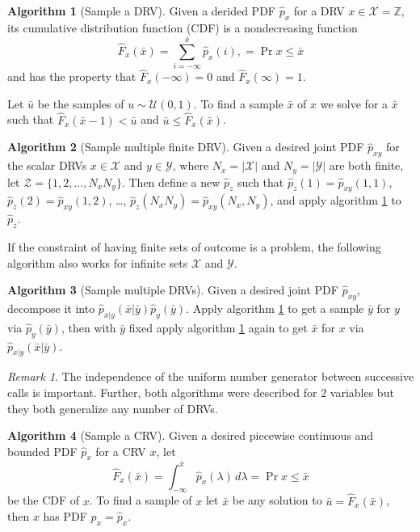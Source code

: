 \documentclass[margin=tiny]{hsrzf}
\theoremstyle{plain}
\theoremstyle{definition}
\newtheorem{alg}{Algorithm}[section]
\theoremstyle{remark}
\newtheorem*{remark}{Remark}
\begin{document}
\begin{alg}[Sample a DRV] \label{alg:sample-drv}
  Given a derided PDF $\hat{p}_x$ for a DRV $x \in \mathcal{X} = \mathbb{Z}$,
  its cumulative distribution function (CDF) is a nondecreasing function
  \[
    \hat{F}_x (\bar{x}) = \sum_{i = -\infty}^{\bar{x}} \hat{p}_x (i),
    = \Pr{x \leq \bar{x}}
  \]
  and has the property that $\hat{F}_x(-\infty) = 0$ and $\hat{F}_x(\infty) =
  1$.

  Let $\bar{u}$ be the samples of $u \sim \mathcal{U}(0,1)$. To find
  a sample $\bar{x}$ of $x$ we solve for a $\bar{x}$ such that
  $\hat{F}_x(\bar{x} -1) < \bar{u}$ and $\bar{u} \leq \hat{F}_x(\bar{x})$.
\end{alg}

\begin{alg}[Sample multiple finite DRV]
  Given a desired joint PDF $\hat{p}_{xy}$ for the scalar DRVs $x \in
  \mathcal{X}$ and $y \in \mathcal{Y}$, where $N_x = |\mathcal{X}|$ and
  $N_y = |\mathcal{Y}|$ are both finite, let $\mathcal{Z} = \{1,2,\ldots,
  N_xN_y\}$. Then define a new $\hat{p}_z$ such that $\hat{p}_z(1) =
  \hat{p}_{xy}(1,1)$, $\hat{p}_z(2) = \hat{p}_{xy}(1,2)$, \dots,
  $\hat{p}_z(N_xN_y) = \hat{p}_{xy}(N_x, N_y)$, and apply algorithm
  \ref{alg:sample-drv} to $\hat{p}_z$.
\end{alg}

If the constraint of having finite sets of outcome is a problem, the following
algorithm also works for infinite sets $\mathcal{X}$ and $\mathcal{Y}$.

\begin{alg}[Sample multiple DRVs] \label{alg:sample-multiple-drvs}
  Given a desired joint PDF $\hat{p}_{xy}$, decompose it into
  $\hat{p}_{x|y}(\bar{x}|\bar{y}) \hat{p}_y(\bar{y})$. Apply algorithm
  \ref{alg:sample-drv} to get a sample $\bar{y}$ for $y$ via
  $\hat{p}_y(\bar{y})$, then with $\bar{y}$ fixed apply algorithm
  \ref{alg:sample-drv} again to get $\bar{x}$ for $x$ via
  $\hat{p}_{x|y}(\bar{x}|\bar{y})$.
\end{alg}

\begin{remark}
  The independence of the uniform number generator between successive calls is
  important. Further, both algorithms were described for 2 variables but they
  both generalize any number of DRVs.
\end{remark}

\begin{alg}[Sample a CRV] \label{alg:sample-crv}
  Given a desired piecewise continuous and bounded PDF $\hat{p}_x$ for a CRV
  $x$, let
  \[
    \hat{F}_x(\bar{x})
      = \int_{-\infty}^{\bar{x}} \hat{p}_x(\lambda) \, d\lambda
      = \Pr{x \leq \bar{x}}
  \]
  be the CDF of $x$. To find a sample of $x$ let $\bar{x}$ be any solution to
  $\bar{u} = \hat{F}_x(\bar{x})$, then $x$ has PDF $p_x = \hat{p}_x$.
\end{alg}
\end{document}
